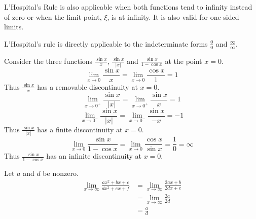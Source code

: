 L'Hospital's Rule is also applicable when both functions tend to infinity
instead of zero or when the limit point, $\xi$, is at infinity.  It 
is also valid for one-sided limits.



L'Hospital's rule is directly applicable to the indeterminate forms
$\frac{0}{0}$ and $\frac{\infty}{\infty}$.


\begin{Example}
  Consider the three functions $\frac{\sin x}{x}$, $\frac{\sin x}{|x|}$ and
  $\frac{\sin x}{1 - \cos x}$ at the point $x = 0$.
  \[
  \lim_{x \to 0} \frac{\sin x}{x}
  = \lim_{x \to 0} \frac{\cos x}{1} 
  = 1
  \]
  Thus $\frac{\sin x}{x}$ has a removable discontinuity at $x = 0$.
  \[
  \lim_{x \to 0^+} \frac{\sin x}{|x|}
  = \lim_{x \to 0^+} \frac{\sin x}{x} = 1
  \]
  \[
  \lim_{x \to 0^-} \frac{\sin x}{|x|}
  = \lim_{x \to 0^-} \frac{\sin x}{-x} = -1
  \]
  Thus $\frac{\sin x}{|x|}$ has a finite discontinuity at $x = 0$.
  \[
  \lim_{x \to 0} \frac{\sin x}{1 - \cos x}
  = \lim_{x \to 0} \frac{\cos x}{\sin x}
  = \frac{1}{0} = \infty
  \]
  Thus $\frac{\sin x}{1 - \cos x}$ has an infinite discontinuity at $x = 0$.
\end{Example}




\begin{Example}
  Let $a$ and $d$ be nonzero.
  \begin{align*}
    \lim_{x \to \infty} \frac{a x^2 + b x + c}{d x^2 + e x + f}
    &= \lim_{x \to \infty} \frac{2 a x + b}{2 d x + e} \\
    &= \lim_{x \to \infty} \frac{2 a}{2 d} \\
    &= \frac{a}{d}
  \end{align*}
\end{Example}





